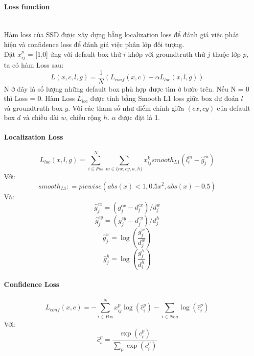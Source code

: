   \paragraph{Loss function}
  \mbox{}\\Hàm loss của SSD được xây dựng bằng localization loss để đánh giá việc phát hiện và confidence loss để đánh giá việc phân lớp đối tượng.
  \\Đặt \(x_{ij}^p\) = [1,0] ứng với default box thứ \(i\) khớp với groundtruth thứ \(j\) thuộc lớp \(p\), ta có hàm Loss sau:
  \[L\left( x,c,l,g \right) = \frac{1}{N} \left( L_{conf} \left( x,c \right) + \alpha L_{loc}\left(x,l,g\right)\right)\]
  N ở đây là số lượng những default box phù hợp được tìm ở bước trên. Nếu N = 0 thì Loss = 0. Hàm Loss \(L_{loc}\) được tính bằng Smooth L1 loss giữa box dự đoán \(l\) và groundtruth box \(g\). Với các tham số như điểm chính giữa \(\left(cx,cy\right)\) của default box \(d\) và chiều dài \(w\), chiều rộng \(h\). \(\alpha\) được đặt là 1.
  \paragraph{Localization Loss}
  \mbox{}\[L_{loc}\left( x,l,g \right) = \sum^N_{i\in Pos} \sum_{m\in\{cx,cy,w,h\}} x_{ij}^k smooth_{L1}\left( l_i^m - \hat{g}^m_j\right)\]
  Với:
  \[smooth_{L1} \colon= piewise( abs( x ) < 1, 0.5x^2, abs( x ) - 0.5)\]
  Và:
  \[\hat{g}_j^{cx} = \left( g_j^{cx} - d_j^{cx} \right)/ d_j^w\]
  \[\hat{g}_j^{cy} = \left( g_j^{cy} - d_j^{cy} \right) / d_j^h\]
  \[\hat{g}_j^w = \log\left( \frac{g_j^w}{d_j^w} \right)\]
  \[\hat{g}_j^h = \log\left( \frac{g_j^h}{d^h_i} \right)\]
  \paragraph{Confidence Loss}
  \mbox{}\[L_{conf} \left( x,c \right) = - \sum_{i \in Pos}^N x_{ij}^p \log \left( \hat{c}_i^p \right) - \sum_{i \in N eg} \log\left( \hat{c}_i^p \right)\]
  Với:
  \[\hat{c}_i^p = \frac{\exp\left( c_i^p \right)}{\sum_p \exp\left( c_i^p \right)}\]

